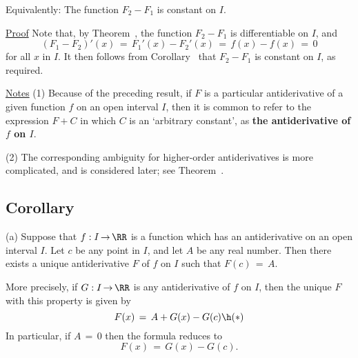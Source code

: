 {    Equivalently: The function $F_{2}-F_{1}$ is constant on $I$.

\V

        \underline{Proof} Note that, by Theorem~, the function $F_{2}-F_{1}$ is differentiable on $I$, and
        \begin{displaymath}
        (F_{1}-F_{2})'(x) \,=\, F_{1}'(x)-F_{2}'(x) \,=\, f(x)-f(x) \,=\, 0
        \end{displaymath}
    for all $x$ in $I$.
    It then follows from Corollary~ that $F_{2}-F_{1}$ is constant on $I$, as required. \Q

\V

        \underline{Notes} (1) Because of the preceding result, if $F$ is a particular antiderivative of a given function $f$ on an open interval $I$,
    then it is common to refer to the expression $F+C$ in which $C$ is an `arbitrary constant', 
    as {\bf the  antiderivative of $f$ on $I$}.

\V

        (2) The corresponding ambiguity for higher-order antiderivatives is more complicated, and is considered later; see Theorem~.

\V
\V

             \subsection{\small{\bf Corollary}}
            \label{CorE45.60}

\V

        \hspace*{\parindent}(a) Suppose that $f:I \,{\rightarrow}\, {\RR}$ is a function which has an antiderivative on an open interval $I$.
    Let $c$ be any point in $I$, and let $A$ be any real number.
    Then there exists a unique antiderivative $F$ of $f$ on $I$ such that $F(c) \,=\, A$.

        More precisely, if $G:I \,{\rightarrow}\, {\RR}$ is any antiderivative of $f$ on $I$, then the unique $F$ with this property is given by
        \begin{displaymath}
        F(x) \,=\, A + G(x) - G(c) \h ({\ast})
        \end{displaymath}
    In particular, if $A \,=\, 0$ then the formula reduces to
        \begin{displaymath}
        F(x) \,=\, G(x)-G(c).
        \end{displaymath}

}

